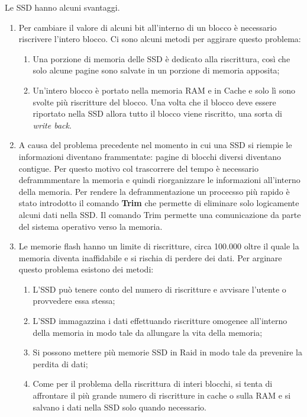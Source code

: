 \documentclass{article}
\begin{document}
Le SSD hanno alcuni svantaggi.
\begin{enumerate}

\item Per cambiare il valore di alcuni bit all'interno di un blocco è necessario riscrivere l'intero blocco. Ci sono alcuni metodi per aggirare questo problema:

	\begin{enumerate}
		\item Una porzione di memoria delle SSD è dedicato alla riscrittura, così che solo alcune pagine sono salvate in un porzione di memoria apposita;

		\item Un'intero blocco è portato nella memoria RAM e in Cache e solo lì sono svolte più riscritture del blocco. Una volta che il blocco deve essere riportato nella SSD allora tutto il blocco viene riscritto, una sorta di \textit{write back}.
	\end{enumerate}

\item A causa del problema precedente nel momento in cui una SSD si riempie le informazioni diventano frammentate: pagine di blocchi diversi diventano contigue. Per questo motivo col trascorrere del tempo è necessario deframmmentare la memoria e quindi riorganizzare le informazioni all'interno della memoria. Per rendere la deframmentazione un procecsso più rapido è stato introdotto il comando \textbf{Trim} che permette di eliminare solo logicamente alcuni dati nella SSD. Il comando Trim permette una comunicazione da parte del sistema operativo verso la memoria.

\item Le memorie flash hanno un limite di riscritture, circa 100.000 oltre il quale la memoria diventa inaffidabile e si rischia di perdere dei dati. Per arginare questo problema esistono dei metodi:
\begin{enumerate}
	\item L'SSD può tenere conto del numero di riscritture e avvisare l'utente o provvedere essa stessa;

	\item L'SSD immagazzina i dati effettuando riscritture omogenee all'interno della memoria in modo tale da allungare la vita della memoria;

	\item Si possono mettere più memorie SSD in Raid in modo tale da prevenire la perdita di dati;

	\item Come per il problema della riscrittura di interi blocchi, si tenta di affrontare il più grande numero di riscritture in cache o sulla RAM e si salvano i dati nella SSD solo quando necessario.
\end{enumerate}

\end{enumerate}
\end{document}
